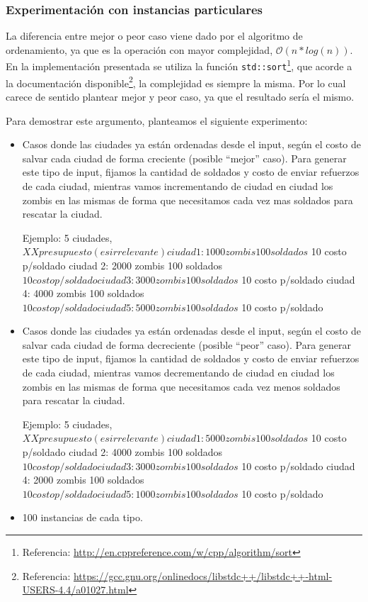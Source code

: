 \subsubsection{Experimentación con instancias particulares}
La diferencia entre mejor o peor caso viene dado por el algoritmo de ordenamiento, ya que es la operación con mayor complejidad, $\mathcal{O}(n*log(n))$. En la implementación presentada se utiliza la función   \texttt{std::sort}\footnote{Referencia:  \url{http://en.cppreference.com/w/cpp/algorithm/sort}}, que acorde a la documentación disponible\footnote{Referencia:  \url{https://gcc.gnu.org/onlinedocs/libstdc++/libstdc++-html-USERS-4.4/a01027.html}}, la complejidad es siempre la misma. Por lo cual carece de sentido plantear mejor y peor caso, ya que el resultado sería el mismo.

Para demostrar este argumento, planteamos el siguiente experimento:
\begin{itemize}
	\item Casos donde las ciudades ya están ordenadas desde el input, según el costo de salvar cada ciudad de forma creciente (posible ``mejor'' caso). Para generar este tipo de input, fijamos la cantidad de soldados y costo de enviar refuerzos de cada ciudad, mientras vamos incrementando de ciudad en ciudad los zombis en las mismas de forma que necesitamos cada vez mas soldados para rescatar la ciudad.
    \begin{codesnippet}
Ejemplo:
5 ciudades, $ XX presupuesto (es irrelevante)
ciudad 1: 1000 zombis 100 soldados $ 10 costo p/soldado
ciudad 2: 2000 zombis 100 soldados $ 10 costo p/soldado
ciudad 3: 3000 zombis 100 soldados $ 10 costo p/soldado
ciudad 4: 4000 zombis 100 soldados $ 10 costo p/soldado
ciudad 5: 5000 zombis 100 soldados $ 10 costo p/soldado
\end{codesnippet}
	\item Casos donde las ciudades ya están ordenadas desde el input, según el costo de salvar cada ciudad de forma decreciente (posible ``peor'' caso). Para generar este tipo de input, fijamos la cantidad de soldados y costo de enviar refuerzos de cada ciudad, mientras vamos decrementando de ciudad en ciudad los zombis en las mismas de forma que necesitamos cada vez menos soldados para rescatar la ciudad.

\begin{codesnippet}
Ejemplo:
5 ciudades, $ XX presupuesto (es irrelevante)
ciudad 1: 5000 zombis 100 soldados $ 10 costo p/soldado
ciudad 2: 4000 zombis 100 soldados $ 10 costo p/soldado
ciudad 3: 3000 zombis 100 soldados $ 10 costo p/soldado
ciudad 4: 2000 zombis 100 soldados $ 10 costo p/soldado
ciudad 5: 1000 zombis 100 soldados $ 10 costo p/soldado
\end{codesnippet}
    \item 100 instancias de cada tipo.
\end{itemize}


